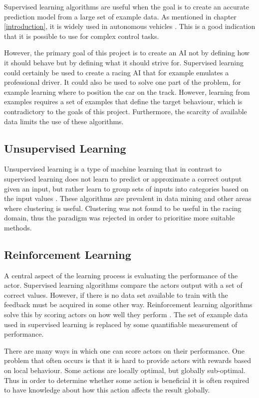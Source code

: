 Supervised learning algorithms are useful when the goal is to create an accurate prediction model from a large set of example data. As mentioned in chapter \ref{introduction}, it is widely used in autonomous vehicles \cite{Stavens, Thrun06, huval2015empirical}. This is a good indication that it is possible to use for complex control tasks.

However, the primary goal of this project is to create an AI not by defining how it should behave but by defining what it should strive for. Supervised learning could certainly be used to create a racing AI that for example emulates a professional driver. It could also be used to solve one part of the problem, for example learning where to position the car on the track. However, learning from examples requires a set of examples that define the target behaviour, which is contradictory to the goals of this project. Furthermore, the scarcity of available data limits the use of these algorithms.  

\subsection{Unsupervised Learning}
Unsupervised learning is a type of machine learning that in contrast to supervised learning does not learn to predict or approximate a correct output given an input, but rather learn to group sets of inputs into categories based on the input values \cite{glossay}. These algorithms are prevalent in data mining and other areas where clustering is useful. Clustering was not found to be useful in the racing domain, thus the paradigm was rejected in order to prioritise more suitable methods. 

\subsection{Reinforcement Learning}
\label{theory:reinforcement_learning}
A central aspect of the learning process is evaluating the performance of the actor. Supervised learning algorithms compare the actors output with a set of correct values. However, if there is no data set available to train with the feedback must be acquired in some other way. Reinforcement learning algorithms solve this by scoring actors on how well they perform \cite{whiteson}. The set of example data used in supervised learning is replaced by some quantifiable measurement of performance.

There are many ways in which one can score actors on their performance. One problem that often occurs is that it is hard to provide actors with rewards based on local behaviour. Some actions are locally optimal, but globally sub-optimal. Thus in order to determine whether some action is beneficial it is often required to have knowledge about how this action affects the result globally.

